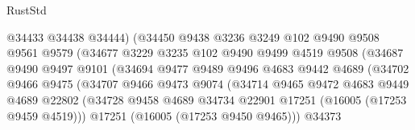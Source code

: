 \begin{lexlean}{RustStd}
\begin{coremodule}
                                  @34433
                                  @34438
                                  @34444)
                                (@34450
                                  @9438
                                  @3236
                                  @3249
                                  @102
                                  @9490
                                  @9508
                                  @9561
                                  @9579
                                  (@34677
                                    @3229
                                    @3235
                                    @102
                                    @9490
                                    @9499
                                    @4519
                                    @9508
                                    (@34687
                                      @9490
                                      @9497
                                      @9101
                                      (@34694
                                        @9477
                                        @9489
                                        @9496
                                        @4683
                                        @9442
                                        @4689
                                        (@34702
                                          @9466
                                          @9475
                                          (@34707
                                            @9466
                                            @9473
                                            @9074
                                            (@34714
                                              @9465
                                              @9472
                                              @4683
                                              @9449
                                              @4689
                                              @22802
                                              (@34728
                                                @9458
                                                @4689
                                                @34734
                                                @22901
                                                @17251
                                                (@16005 (@17253 @9459 @4519)))
                                              @17251
                                              (@16005 (@17253 @9450 @9465)))
                                            @34373

\end{coremodule}
\end{lexlean}
